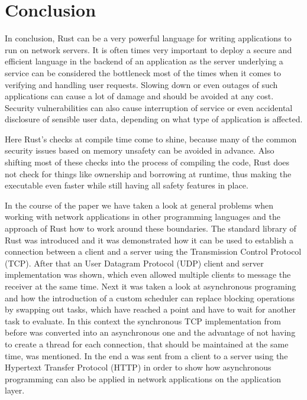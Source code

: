 
\section{Conclusion}
In conclusion, Rust can be a very powerful language for writing applications to run on network servers. It is often
times very important to deploy a secure and efficient language in the backend of an application as the server
underlying a service can be considered the bottleneck most of the times when it comes to verifying and handling user
requests. Slowing down or even outages of such applications can cause a lot of damage and should be avoided at any
cost. Security vulnerabilities can also cause interruption of service or even accidental disclosure of sensible user
data, depending on what type of application is affected.

Here Rust's checks at compile time come to shine, because many of the common security issues based on memory unsafety
can be avoided in advance. Also shifting most of these checks into the process of compiling the code, Rust does not
check for things like ownership and borrowing at runtime, thus making the executable even faster while still having
all safety features in place.

In the course of the paper we have taken a look at general problems when working with network applications in other
programming languages and the approach of Rust how to work around these boundaries. The standard library of Rust was
introduced and it was demonstrated how it can be used to establish a connection between a client and a server using the
Transmission Control Protocol (TCP). After that an User Datagram Protocol (UDP) client and server implementation was
shown, which even allowed multiple clients to message the receiver at the same time. Next it was taken a look at
asynchronous programing and how the introduction of a custom scheduler can replace blocking operations by swapping
out tasks, which have reached a  point and have to wait for another task to evaluate. In this context the
synchronous TCP implementation from before was converted into an asynchronous one and the advantage of not having to
create a thread for each connection, that should be maintained at the same time, was mentioned. In the end a
 was sent from a client to a server using the Hypertext Transfer Protocol (HTTP) in order to show how
asynchronous programming can also be applied in network applications on the application layer.

